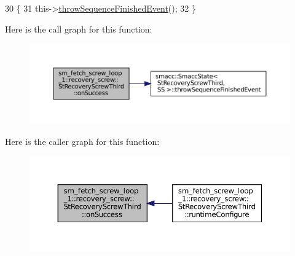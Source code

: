\begin{DoxyCode}
30             \{
31                 this->\hyperlink{classsmacc_1_1SmaccState_a49dcfc25824f7e083dd4b999c49ab2b6}{throwSequenceFinishedEvent}();
32             \}
\end{DoxyCode}
Here is the call graph for this function\+:
\nopagebreak
\begin{figure}[H]
\begin{center}
\leavevmode
\includegraphics[width=350pt]{structsm__fetch__screw__loop__1_1_1recovery__screw_1_1StRecoveryScrewThird_ad2d8eab6f798eff92197acb3242a5860_cgraph}
\end{center}
\end{figure}
Here is the caller graph for this function\+:
\nopagebreak
\begin{figure}[H]
\begin{center}
\leavevmode
\includegraphics[width=350pt]{structsm__fetch__screw__loop__1_1_1recovery__screw_1_1StRecoveryScrewThird_ad2d8eab6f798eff92197acb3242a5860_icgraph}
\end{center}
\end{figure}
\mbox{\label{structsm__fetch__screw__loop__1_1_1recovery__screw_1_1StRecoveryScrewThird_a31a386e480d4abe7cd2014c92ee67dbc}} 
